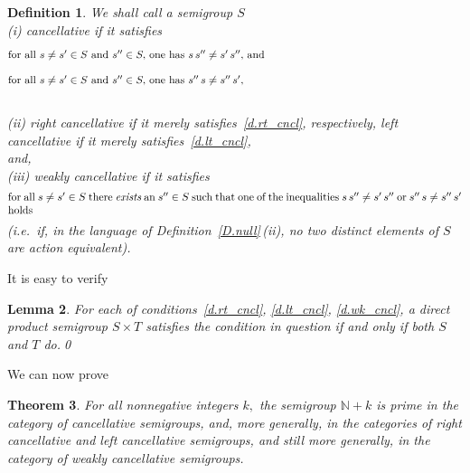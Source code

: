 \documentclass{amsart}
\newtheorem{theorem}{Theorem}
\newtheorem{lemma}[theorem]{Lemma}
\newtheorem{definition}[theorem]{Definition}
\numberwithin{equation}{section}
\numberwithin{theorem}{section}
\newcommand{\N}{\mathbb{N}}
\begin{document}
\begin{definition}\label{D.cancellative}
We shall call a semigroup $S$\\[.3em]
%
{\rm(i)} {\em cancellative} if it satisfies
%
\begin{equation}\begin{minipage}[c]{35pc}\label{d.rt_cncl}
for all $s\neq s'\in S$ and $s''\in S,$ one has $s\,s''\neq s'\,s'',$
and
\end{minipage}\end{equation}
\vspace{-1.8em}
%
\begin{equation}\begin{minipage}[c]{35pc}\label{d.lt_cncl}
for all $s\neq s'\in S$ and $s''\in S,$ one has $s''\,s\neq s''\,s',$
\end{minipage}\end{equation}
\vspace{-.8em}\\
%
{\rm(ii)} {\em right} cancellative if it
merely satisfies~\eqref{d.rt_cncl},
respectively, {\em left} cancellative if it
merely satisfies~\eqref{d.lt_cncl},\\[.3em]
%
and,\\[.3em]
%
{\rm(iii)} {\em weakly} cancellative if it satisfies
%
\begin{equation}\begin{minipage}[c]{35pc}\label{d.wk_cncl}
for all $s\neq s'\in S$ there {\em exists} an $s''\in S$ such
that one of the inequalities $s\,s''\neq s'\,s''$ or
$s''\,s\neq s''\,s'$ holds
\end{minipage}\end{equation}
%
\textup{(}i.e.~if, in the language of
Definition~\ref{D.null}\,{\rm(ii),}
no two distinct elements of $S$ are action equivalent\textup{)}.
\end{definition}

It is easy to verify

\begin{lemma}\label{L.prods_&_cdns}
For each of conditions~\eqref{d.rt_cncl}, \eqref{d.lt_cncl},
\eqref{d.wk_cncl}, a direct product semigroup $S\times T$ satisfies
the condition in question if and only if both $S$ and $T$ do.\qed
\end{lemma}

We can now prove

\begin{theorem}\label{T.cancellative}
For all nonnegative integers $k,$ the semigroup $\N\!+\!k$ is prime
in the category of cancellative semigroups, and, more generally,
in the categories of right cancellative and left cancellative
semigroups, and still more generally, in the category of
weakly cancellative semigroups.
\end{theorem}
\end{document}
